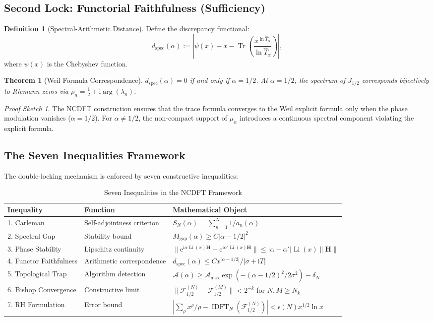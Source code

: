 \documentclass[12pt,a4paper]{article}
\theoremstyle{definition}
\newtheorem{definition}{Definition}[section]
\theoremstyle{plain}
\newtheorem{theorem}{Theorem}[section]
\theoremstyle{remark}
\newtheorem*{proofsketch}{Proof Sketch}
\DeclareMathOperator{\Tr}{Tr}
\DeclareMathOperator{\Li}{Li}
\DeclareMathOperator{\IDFT}{IDFT}
\newcommand{\F}{\mathcal{F}}
\newcommand{\T}{\hat{T}}
\newcommand{\ee}{\mathrm{e}}
\newcommand{\ii}{\mathrm{i}}
\begin{document}
\subsection{Second Lock: Functorial Faithfulness (Sufficiency)}
\begin{definition}[Spectral-Arithmetic Distance]
Define the discrepancy functional:
\[
d_{\text{spec}}(\alpha) := \left| \psi(x) - x - \Tr\left(\frac{x^{\ln \T_\alpha}}{\ln \T_\alpha}\right) \right|,
\]
where $\psi(x)$ is the Chebyshev function.
\end{definition}

\begin{theorem}[Weil Formula Correspondence]\label{thm:weil}
$d_{\text{spec}}(\alpha) = 0$ if and only if $\alpha = 1/2$. At $\alpha = 1/2$, the spectrum of $J_{1/2}$ corresponds bijectively to Riemann zeros via $\rho_n = \frac{1}{2} + \ii \arg(\lambda_n)$.
\end{theorem}

\begin{proofsketch}
The NCDFT construction ensures that the trace formula converges to the Weil explicit formula only when the phase modulation vanishes ($\alpha = 1/2$). For $\alpha \neq 1/2$, the non-compact support of $\mu_\alpha$ introduces a continuous spectral component violating the explicit formula.
\end{proofsketch}

\subsection{The Seven Inequalities Framework}
The double-locking mechanism is enforced by seven constructive inequalities:

\begin{table}[h]
\centering
\caption{Seven Inequalities in the NCDFT Framework}
\begin{tabular}{@{}lll@{}} \toprule
\textbf{Inequality} & \textbf{Function} & \textbf{Mathematical Object} \\ \midrule
1. Carleman & Self-adjointness criterion & $S_N(\alpha) = \sum_{n=1}^N 1/a_n(\alpha)$ \\
2. Spectral Gap & Stability bound & $M_{\text{gap}}(\alpha) \geq C|\alpha-1/2|^2$ \\
3. Phase Stability & Lipschitz continuity & $\|\ee^{\ii\alpha\Li(x)\mathbf{H}} - \ee^{\ii\alpha'\Li(x)\mathbf{H}}\| \leq |\alpha-\alpha'|\Li(x)\|\mathbf{H}\|$ \\
4. Functor Faithfulness & Arithmetic correspondence & $d_{\text{spec}}(\alpha) \leq C x^{|\alpha-1/2|}/|\sigma+\ii T|$ \\
5. Topological Trap & Algorithm detection & $\mathcal{A}(\alpha) \geq \mathcal{A}_{\max}\exp(-(\alpha-1/2)^2/2\sigma^2) - \delta_N$ \\
6. Bishop Convergence & Constructive limit & $\|\F_{1/2}^{(N)} - \F_{1/2}^{(M)}\| < 2^{-k}$ for $N,M \geq N_k$ \\
7. RH Formulation & Error bound & $|\sum_\rho x^\rho/\rho - \IDFT_N(\F_{1/2}^{(N)})| < \epsilon(N)x^{1/2}\ln x$ \\ \bottomrule
\end{tabular}
\end{table}
\end{document}
